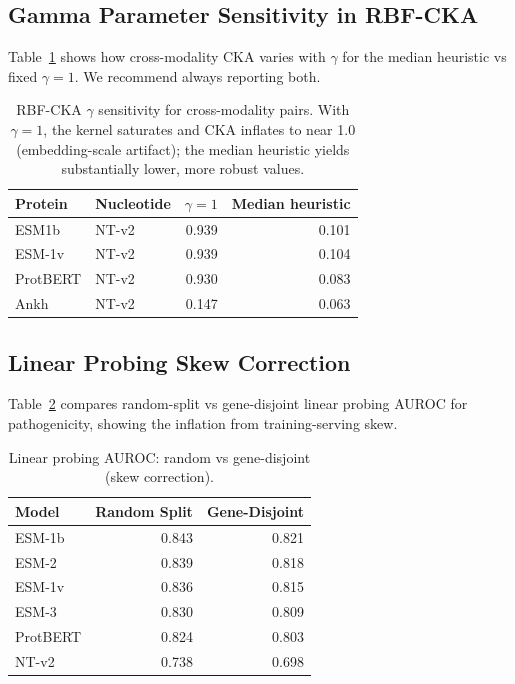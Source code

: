 \documentclass[9pt]{article}
\begin{document}
\subsection{Gamma Parameter Sensitivity in RBF-CKA}

Table~\ref{tab:gamma_sensitivity} shows how cross-modality CKA varies with $\gamma$ for the median heuristic vs fixed $\gamma = 1$. We recommend always reporting both.

\begin{table}[h]
\centering
\caption{RBF-CKA $\gamma$ sensitivity for cross-modality pairs. With $\gamma = 1$, the kernel saturates and CKA inflates to near 1.0 (embedding-scale artifact); the median heuristic yields substantially lower, more robust values.}
\label{tab:gamma_sensitivity}
\small
\begin{tabular}{llrr}
\toprule
\textbf{Protein} & \textbf{Nucleotide} & \textbf{$\gamma=1$} & \textbf{Median heuristic} \\
\midrule
ESM1b & NT-v2 & 0.939 & 0.101 \\
ESM-1v & NT-v2 & 0.939 & 0.104 \\
ProtBERT & NT-v2 & 0.930 & 0.083 \\
Ankh & NT-v2 & 0.147 & 0.063 \\
\bottomrule
\end{tabular}
\end{table}

\subsection{Linear Probing Skew Correction}

Table~\ref{tab:probing_skew} compares random-split vs gene-disjoint linear probing AUROC for pathogenicity, showing the inflation from training-serving skew.

\begin{table}[h]
\centering
\caption{Linear probing AUROC: random vs gene-disjoint (skew correction).}
\label{tab:probing_skew}
\small
\begin{tabular}{lrr}
\toprule
\textbf{Model} & \textbf{Random Split} & \textbf{Gene-Disjoint} \\
\midrule
ESM-1b & 0.843 & 0.821 \\
ESM-2 & 0.839 & 0.818 \\
ESM-1v & 0.836 & 0.815 \\
ESM-3 & 0.830 & 0.809 \\
ProtBERT & 0.824 & 0.803 \\
NT-v2 & 0.738 & 0.698 \\
\bottomrule
\end{tabular}
\end{table}
\end{document}
